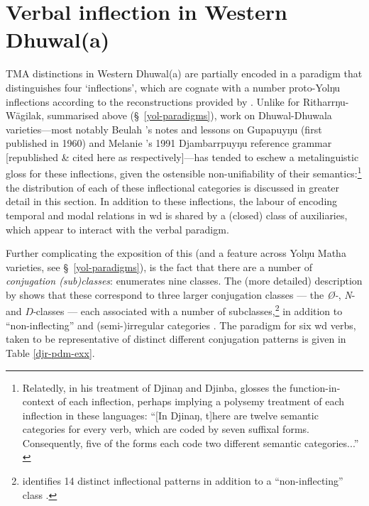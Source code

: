 \section{Verbal inflection in Western Dhuwal(a)}\label{djr-infl}


TMA distinctions in Western Dhuwal(a) are partially encoded in a paradigm that distinguishes four `inflections', which are cognate with a number proto-Yolŋu inflections according to the reconstructions provided by \citet{Bowern2009}. Unlike for Ritharrŋu-Wägilak, summarised above (\S~\ref{yol-paradigms}), work on Dhuwal-Dhuwala varieties---most notably Beulah \citeauthor{Lowe1996}'s notes and lessons on Gupapuyŋu (first published in 1960) and Melanie \citeauthor{Wilkinson1991}'s 1991 Djambarrpuyŋu reference grammar [republished \& cited here as \citealp{Lowe1996,Wilkinson1991} respectively]---has tended to eschew a metalinguistic gloss for these inflections, given the ostensible non-unifiability of their semantics:\footnote{Relatedly, in his treatment of Djinaŋ and Djinba, \citet{Waters1980,Waters1989} glosses the function-in-context of each inflection, perhaps implying a polysemy treatment of each inflection in these languages: ``[In Djinaŋ, t]here are twelve semantic categories for every verb, which are coded by seven suffixal forms. Consequently, five of the forms each code two different semantic categories...'' \citeyear[142]{Waters1980}} the distribution of each of these inflectional categories is discussed in greater detail in this section. In addition to these inflections, the labour of encoding temporal and modal relations in \gls{wd} is shared by a (closed) class of auxiliaries, which appear to interact with the verbal paradigm. 




Further complicating the exposition of this (and a feature across Yolŋu Matha varieties, see \S~\ref{yol-paradigms}), is the fact that there are a number of \textit{conjugation (sub)classes}: \citet{Lowe1996} enumerates nine classes. The (more detailed) description by \citet{Wilkinson1991} shows that these correspond to three larger conjugation classes --- the \textit{Ø-}, \textit{N}- and \textit{Ŋ-}classes --- each associated with a number of subclasses,\footnote{\citeauthor{Wilkinson1991} identifies 14 distinct inflectional patterns in addition to a ``non-inflecting'' class \citeyearpar[307]{Wilkinson1991}.} in addition to ``non-inflecting'' and (semi-)irregular categories \citep{Wilkinson1991}. The paradigm for six \gls{wd} verbs, taken to be representative of distinct different conjugation patterns is given in Table \ref{djr-pdm-exx}.

